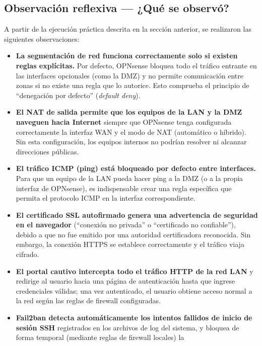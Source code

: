 \documentclass{article}
\providecommand{\tightlist}{%
  \setlength{\itemsep}{0pt}\setlength{\parskip}{0pt}}
\renewcommand{\_}{\oldunderscore\hskip0pt\relax}
\begin{document}
\hypertarget{observaciuxf3n-reflexiva-quuxe9-se-observuxf3}{%
\subsection{Observación reflexiva --- ¿Qué se
observó?}\label{observaciuxf3n-reflexiva-quuxe9-se-observuxf3}}

A partir de la ejecución práctica descrita en la sección anterior, se
realizaron las siguientes observaciones:

\begin{itemize}
\tightlist
\item
  \textbf{La segmentación de red funciona correctamente solo si existen
  reglas explícitas.} Por defecto, OPNsense bloquea todo el tráfico
  entrante en las interfaces opcionales (como la DMZ) y no permite
  comunicación entre zonas si no existe una regla que lo autorice. Esto
  comprueba el principio de ``denegación por defecto'' (\emph{default
  deny}).
\item
  \textbf{El NAT de salida permite que los equipos de la LAN y la DMZ
  naveguen hacia Internet} siempre que OPNsense tenga configurada
  correctamente la interfaz WAN y el modo de NAT (automático o híbrido).
  Sin esta configuración, los equipos internos no podrían resolver ni
  alcanzar direcciones públicas.
\item
  \textbf{El tráfico ICMP (ping) está bloqueado por defecto entre
  interfaces.} Para que un equipo de la LAN pueda hacer ping a la DMZ (o
  a la propia interfaz de OPNsense), es indispensable crear una regla
  específica que permita el protocolo ICMP en la interfaz
  correspondiente.
\item
  \textbf{El certificado SSL autofirmado genera una advertencia de
  seguridad en el navegador} (``conexión no privada'' o ``certificado no
  confiable''), debido a que no fue emitido por una autoridad
  certificadora reconocida. Sin embargo, la conexión HTTPS se establece
  correctamente y el tráfico viaja cifrado.
\item
  \textbf{El portal cautivo intercepta todo el tráfico HTTP de la red
  LAN} y redirige al usuario hacia una página de autenticación hasta que
  ingrese credenciales válidas; una vez autenticado, el usuario obtiene
  acceso normal a la red según las reglas de firewall configuradas.
\item
  \textbf{Fail2ban detecta automáticamente los intentos fallidos de
  inicio de sesión SSH} registrados en los archivos de log del sistema,
  y bloquea de forma temporal (mediante reglas de firewall locales) la

\end{itemize}
\end{document}
